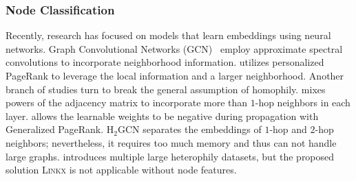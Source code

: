 \subsubsection*{Node Classification}
Recently, research has focused on models that learn embeddings using neural networks. 
Graph Convolutional Networks (GCN)~\cite{kipf2016semi} employ approximate spectral convolutions to incorporate neighborhood information.
\appnp \cite{klicpera2018predict} utilizes personalized PageRank to leverage the local information and a larger neighborhood.
Another branch of studies turn to break the general assumption of homophily.
\mixhop \cite{abu2019mixhop} mixes powers of the adjacency matrix to incorporate more than $1$-hop neighbors in each layer.
\gprgnn \cite{chien2021adaptive} allows the learnable weights to be negative during propagation with Generalized PageRank.
$\text{H}_{2}$GCN \cite{zhu2020beyond} separates the embeddings of $1$-hop and $2$-hop neighbors; nevertheless, it requires too much memory and thus can not handle large graphs.
\cite{lim2021large} introduces multiple large heterophily datasets, but the proposed solution \textsc{Linkx} is not applicable without node features.